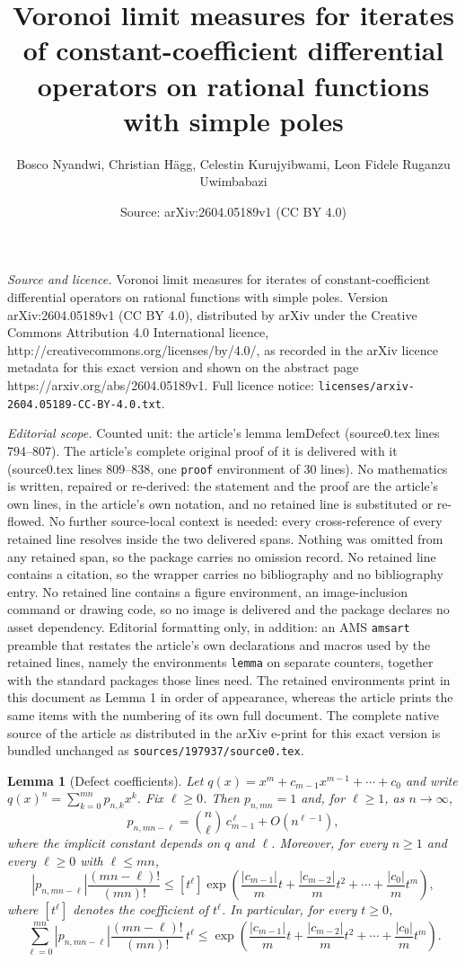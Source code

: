 \documentclass[10pt,a4paper]{amsart}
\title{Voronoi limit measures for iterates of constant-coefficient differential operators on rational functions with simple poles}
\author{Bosco Nyandwi, Christian H\"agg, Celestin Kurujyibwami, Leon Fidele Ruganzu Uwimbabazi}
\date{Source: arXiv:2604.05189v1 (CC BY 4.0)}
\newtheorem{lemma}{Lemma}
\begin{document}
\maketitle

\noindent\emph{Source and licence.} Voronoi limit measures for iterates of constant-coefficient differential operators on rational functions with simple poles. Version arXiv:2604.05189v1 (CC BY 4.0), distributed by arXiv under the Creative Commons Attribution 4.0 International licence, http://creativecommons.org/licenses/by/4.0/, as recorded in the arXiv licence metadata for this exact version and shown on the abstract page https://arxiv.org/abs/2604.05189v1. Full licence notice: \texttt{licenses/arxiv-2604.05189-CC-BY-4.0.txt}.\par\smallskip

\noindent\textit{Editorial scope.} Counted unit: the article's lemma lemDefect (source0.tex lines 794--807). The article's complete original proof of it is delivered with it (source0.tex lines 809--838, one \texttt{proof} environment of 30 lines). No mathematics is written, repaired or re-derived: the statement and the proof are the article's own lines, in the article's own notation, and no retained line is substituted or re-flowed.  No further source-local context is needed: every cross-reference of every retained line resolves inside the two delivered spans.  Nothing was omitted from any retained span, so the package carries no omission record.  No retained line contains a citation, so the wrapper carries no bibliography and no bibliography entry.  No retained line contains a figure environment, an image-inclusion command or drawing code, so no image is delivered and the package declares no asset dependency.  Editorial formatting only, in addition: an AMS \texttt{amsart} preamble that restates the article's own declarations and macros used by the retained lines, namely the environments \texttt{lemma} on separate counters, together with the standard packages those lines need.  The retained environments print in this document as Lemma 1 in order of appearance, whereas the article prints the same items with the numbering of its own full document.  The complete native source of the article as distributed in the arXiv e-print for this exact version is bundled unchanged as \texttt{sources/197937/source0.tex}.
\begin{lemma}[Defect coefficients]\label{lemDefect}
Let $q(x)=x^m+c_{m-1}x^{m-1}+\cdots+c_0$ and write $q(x)^n=\sum_{k=0}^{mn}p_{n,k}x^k$.
Fix $\ell\ge0$.
Then $p_{n,mn}=1$ and, for $\ell\ge1$, as $n\to\infty$,
$$p_{n,mn-\ell}=\binom{n}{\ell}\,c_{m-1}^{\,\ell}+O(n^{\ell-1}),$$
where the implicit constant depends on $q$ and $\ell$.
Moreover, for every $n\ge1$ and every $\ell\ge0$ with $\ell\le mn$,
$$\left|p_{n,mn-\ell}\right|\frac{(mn-\ell)!}{(mn)!}
\le [t^\ell]\exp\left(\frac{|c_{m-1}|}{m}t+\frac{|c_{m-2}|}{m}t^2+\cdots+\frac{|c_0|}{m}t^m\right),$$
where $[t^\ell]$ denotes the coefficient of $t^\ell$.
In particular, for every $t\ge0$,
$$\sum_{\ell=0}^{mn}\left|p_{n,mn-\ell}\right|\frac{(mn-\ell)!}{(mn)!}\,t^\ell
\le \exp\left(\frac{|c_{m-1}|}{m}t+\frac{|c_{m-2}|}{m}t^2+\cdots+\frac{|c_0|}{m}t^m\right).$$
\end{lemma}
\end{document}
